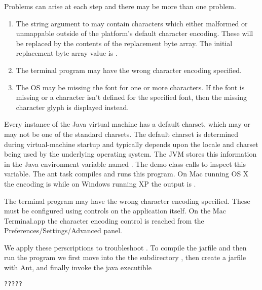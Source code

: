 Problems can arise at each step and there may be more than one problem.
\begin{enumerate}
\item The string argument to  may contain characters which 
either malformed or unmappable outside of the platform's default character encoding.
These will be replaced by the contents of the replacement byte array.
The initial replacement byte array value is .
\item The terminal program may have the wrong character encoding specified.
\item The OS may be missing the font for one or more characters.
If the font is missing or a character isn't defined for the specified font,
then the missing character glyph is displayed instead.
\end{enumerate}






Every instance of the Java virtual machine has a default charset,
which may or may not be one of the standard charsets. The default
charset is determined during virtual-machine startup and typically
depends upon the locale and charset being used by the underlying
operating system.
The JVM stores this information in the Java environment variable named .
The demo class  
calls  to inspect this variable.
%
%
The ant task  compiles and runs this program.
On Mac running OS X the encoding is 
while on Windows running XP the output is .




The terminal program may have the wrong character encoding specified.
These must be configured using controls on the application itself.
On the Mac Terminal.app the character encoding control is reached from the
Preferences/Settings/Advanced panel.


We apply these perscriptions to troubleshoot .
To compile the jarfile and then run the program
we first move into the
the subdirectory ,
then create a jarfile with Ant,
and finally invoke the java executible
%
%
\begin{verbatim} 
?????
\end{verbatim}
%




